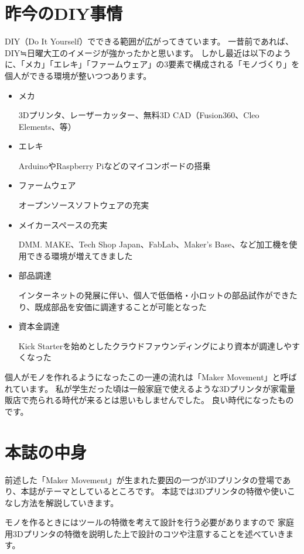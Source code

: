 \section{昨今のDIY事情}\label{ux6628ux4ecaux306ediyux4e8bux60c5}

DIY（Do It Yourself）でできる範囲が広がってきています。
一昔前であれば、DIY≒日曜大工のイメージが強かったかと思います。
しかし最近は以下のように、「メカ」「エレキ」「ファームウェア」の3要素で構成される「モノづくり」を個人ができる環境が整いつつあります。

\begin{itemize}
\tightlist
\item
  メカ \par
     3Dプリンタ、レーザーカッター、無料3D CAD（Fusion360、Cleo
  Elements、等）
\item
  エレキ \par
     ArduinoやRaspberry Piなどのマイコンボードの搭乗
\item
  ファームウェア \par
    オープンソースソフトウェアの充実
\item
  メイカースペースの充実 \par
    DMM. MAKE、Tech Shop Japan、FabLab、Maker's
  Base、など加工機を使用できる環境が増えてきました
\item
  部品調達 \par
     インターネットの発展に伴い、個人で低価格・小ロットの部品試作ができたり、既成部品を安価に調達することが可能となった
\item
  資本金調達\par 
     Kick
  Starterを始めとしたクラウドファウンディングにより資本が調達しやすくなった
\end{itemize}

個人がモノを作れるようになったこの一連の流れは「Maker
Movement」と呼ばれています。
私が学生だった頃は一般家庭で使えるような3Dプリンタが家電量販店で売られる時代が来るとは思いもしませんでした。
良い時代になったものです。

\section{本誌の中身}\label{ux672cux8a8cux306eux4e2dux8eab}

前述した「Maker
Movement」が生まれた要因の一つが3Dプリンタの登場であり、本誌がテーマとしているところです。
本誌では3Dプリンタの特徴や使いこなし方法を解説していきます。

モノを作るときにはツールの特徴を考えて設計を行う必要がありますので
家庭用3Dプリンタの特徴を説明した上で設計のコツや注意することを述べていきます。

